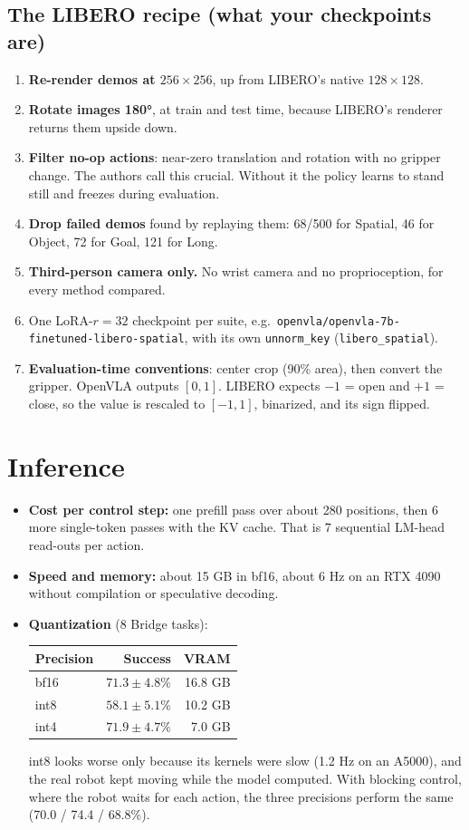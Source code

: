 \documentclass[11pt]{article}
\begin{document}
\subsection{The LIBERO recipe (what your checkpoints are)}
\begin{enumerate}
  \item \textbf{Re-render demos at $256\times256$}, up from LIBERO's native $128\times128$.
  \item \textbf{Rotate images 180°}, at train and test time, because LIBERO's renderer returns them upside down.
  \item \textbf{Filter no-op actions}: near-zero translation and rotation with no gripper change. The authors call this crucial. Without it the policy learns to stand still and freezes during evaluation.
  \item \textbf{Drop failed demos} found by replaying them: 68/500 for Spatial, 46 for Object, 72 for Goal, 121 for Long.
  \item \textbf{Third-person camera only.} No wrist camera and no proprioception, for every method compared.
  \item One LoRA-$r{=}32$ checkpoint per suite, e.g.\ \texttt{openvla/openvla-7b-finetuned-libero-spatial}, with its own \texttt{unnorm\_key} (\texttt{libero\_spatial}).
  \item \textbf{Evaluation-time conventions}: center crop (90\% area), then convert the gripper. OpenVLA outputs $[0,1]$. LIBERO expects $-1$ = open and $+1$ = close, so the value is rescaled to $[-1,1]$, binarized, and its sign flipped.
\end{enumerate}

\section{Inference}

\begin{itemize}
  \item \textbf{Cost per control step:} one prefill pass over about 280 positions, then 6 more single-token passes with the KV cache. That is 7 sequential LM-head read-outs per action.
  \item \textbf{Speed and memory:} about 15 GB in bf16, about 6 Hz on an RTX 4090 without compilation or speculative decoding.
  \item \textbf{Quantization} (8 Bridge tasks):
\begin{center}
\begin{tabular}{@{}lrr@{}}
\toprule
Precision & Success & VRAM \\
\midrule
bf16 & $71.3\pm4.8\%$ & 16.8 GB \\
int8 & $58.1\pm5.1\%$ & 10.2 GB \\
int4 & $71.9\pm4.7\%$ & 7.0 GB \\
\bottomrule
\end{tabular}
\end{center}
int8 looks worse only because its kernels were slow (1.2 Hz on an A5000), and the real robot kept moving while the model computed. With blocking control, where the robot waits for each action, the three precisions perform the same (70.0 / 74.4 / 68.8\%).
\end{itemize}
\end{document}
